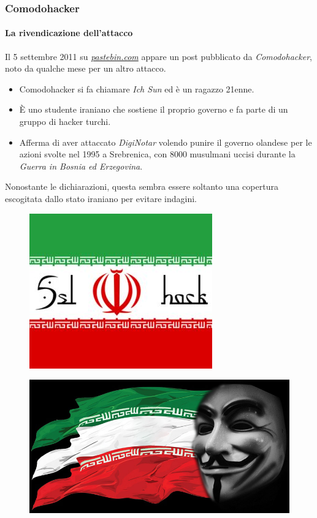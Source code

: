 \documentclass{beamer}
\begin{document}
\begin{frame}
\frametitle{Comodohacker}
\framesubtitle{La rivendicazione dell'attacco}
Il 5 settembre 2011 su \href{https://pastebin.com/1AxH30em}{\textit{\alert{pastebin.com}}} appare un post pubblicato da \textit{\alert{Comodohacker}}, noto da qualche mese per un altro attacco.
\begin{itemize}
	\item Comodohacker si fa chiamare \textit{Ich Sun} ed è un ragazzo 21enne.
	\item È uno \alert{studente iraniano} che sostiene il proprio governo e fa parte di un gruppo di hacker turchi.
	\item Afferma di aver attaccato \textit{DigiNotar} volendo \alert{punire il governo olandese} per le azioni svolte nel 1995 a Srebrenica, con 8000 musulmani uccisi durante la \alert{\textit{Guerra in Bosnia ed Erzegovina}}.
\end{itemize}
Nonostante le dichiarazioni, questa sembra essere soltanto una copertura escogitata dallo stato iraniano per evitare indagini.
\begin{multicols}{2}
\begin{figure}[H]
	\centering
	\includegraphics[scale=0.35]{iranhack}
\end{figure}
\columnbreak
\begin{figure}[H]
	\centering
	\includegraphics[scale=0.36]{ira}
\end{figure}
\end{multicols}
\end{frame}
\end{document}
